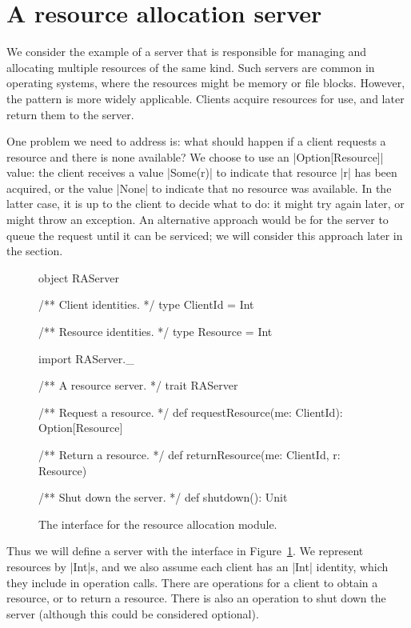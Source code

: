 
\section{A resource allocation server}

We consider the example of a server that is responsible for managing and
allocating multiple resources of the same kind.  Such servers are common in
operating systems, where the resources might be memory or file blocks.
However, the pattern is more widely applicable.  Clients acquire resources for
use, and later return them to the server.

One problem we need to address is: what should happen if a client requests a
resource and there is none available?  We choose to use an |Option[Resource]|
value: the client receives a value |Some(r)| to indicate that resource |r| has
been acquired, or the value |None| to indicate that no resource was available.
%
In the latter case, it is up to the client to decide what to do: it might try
again later, or might throw an exception.  
%
An alternative approach would be for the server to queue the request until it
can be serviced; we will consider this approach later in the section.


\begin{figure}
\begin{scala}
object RAServer{
  /** Client identities. */
  type ClientId = Int

  /** Resource identities. */
  type Resource = Int
}

import RAServer._

/** A resource server. */
trait RAServer{
  /** Request a resource. */
  def requestResource(me: ClientId): Option[Resource]

  /** Return a resource. */
  def returnResource(me: ClientId, r: Resource) 

  /** Shut down the server. */
  def shutdown(): Unit
} 
\end{scala}
\caption{The interface for the resource allocation module.}
\label{fig:RAServer}
\end{figure}


Thus we will define a server with the interface in Figure~\ref{fig:RAServer}.
We represent resources by |Int|s, and we also assume each client has an |Int|
identity, which they include in operation calls.  There are operations for a
client to obtain a resource, or to return a resource.  There is also an
operation to shut down the server (although this could be considered
optional). 

